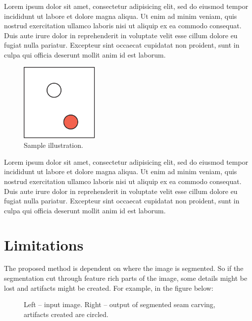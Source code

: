 \documentclass[conference]{acmsiggraph}
\begin{document}
Lorem ipsum dolor sit amet, consectetur adipisicing elit, sed do
eiusmod tempor incididunt ut labore et dolore magna aliqua. Ut enim ad
minim veniam, quis nostrud exercitation ullamco laboris nisi ut
aliquip ex ea commodo consequat. Duis aute irure dolor in
reprehenderit in voluptate velit esse cillum dolore eu fugiat nulla
pariatur. Excepteur sint occaecat cupidatat non proident, sunt in
culpa qui officia deserunt mollit anim id est laborum.

\begin{figure}[ht]
  \centering
  \includegraphics[width=1.5in]{images/samplefigure}
  \caption{Sample illustration.}
\end{figure}

Lorem ipsum dolor sit amet, consectetur adipisicing elit, sed do
eiusmod tempor incididunt ut labore et dolore magna aliqua. Ut enim ad
minim veniam, quis nostrud exercitation ullamco laboris nisi ut
aliquip ex ea commodo consequat. Duis aute irure dolor in
reprehenderit in voluptate velit esse cillum dolore eu fugiat nulla
pariatur. Excepteur sint occaecat cupidatat non proident, sunt in
culpa qui officia deserunt mollit anim id est laborum.


\section{Limitations}

The proposed method is dependent on where the image is segmented. So if the segmentation cut through feature rich parts of the image, some details might be lost and artifacts might be created. For example, in the figure below:

\begin{figure}[ht]       
    \caption{Left -- input image. Right -- output of segmented seam carving, artifacts created are circled.}
    \label{fig:Beach_in_and_out}
    
\end{figure}
\end{document}
